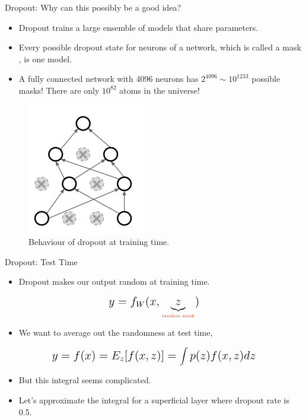 \documentclass[compress,oilve,t]{beamer}
\newcommand{\tc}[2]{
	\textcolor{#1}{\hspace{-2pt}#2\hspace{-2pt}}
}
\begin{document}
\begin{frame}{Dropout: Why can this possibly be a good idea?}
	\begin{itemize}
		\item Dropout trains a \tc{keywords}{large ensemble of models} that share parameters.
		\medskip
		\item Every possible dropout state for neurons of a network, which is called a \tc{keywords}{mask}, is one model.
		\item A fully connected network with 4096 neurons has $2^{4096} \sim 10^{1233}$ possible masks! There are only $10^{82}$ atoms in the universe!
	\end{itemize}
	\begin{figure}[H]
		\centering
		\includegraphics[height=0.4\textheight]{Figs/section_4/dropout_why2.png}
		\caption{Behaviour of dropout at training time. \cite{cs231n-2018-lecture7}}
	\end{figure}
\end{frame}
\begin{frame}{Dropout: Test Time}
	\begin{itemize}
		\item Dropout makes our output random at training time.
		\medskip
	\end{itemize}
	\begin{equation*}
		\mathlarger{\mathlarger{
				y = f_W(x, \underbrace{z}_{\text{\tiny{\tc{keywords}{random mask}}}})
		}}
	\end{equation*}
	\begin{itemize}
		\item We want to \tc{keywords}{average out} the randomness at test time,
		\medskip
	\end{itemize}
	\begin{equation*}
		\mathlarger{\mathlarger{
				y = f(x) = E_z[f(x, z)] = \int p(z)f(x, z) dz
		}}
	\end{equation*}
	\begin{itemize}
		\item But this integral seems complicated.
		\medskip
		\item Let's approximate the integral for a superficial layer where dropout rate is 0.5.
	\end{itemize}
\end{frame}
\end{document}
